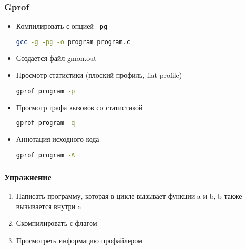 \begin{frame}[fragile]
 \frametitle{Gprof}
 \begin{itemize}
   \item Компилировать с опцией \texttt{-pg}
\begin{lstlisting}[language=sh]
 gcc -g -pg -o program program.c
\end{lstlisting}
   \item Создается файл gmon.out
   \item Просмотр статистики (плоский профиль, flat profile) 
\begin{lstlisting}[language=sh]
gprof program -p
\end{lstlisting}
    \item Просмотр графа вызовов со статистикой
\begin{lstlisting}[language=sh]
gprof program -q
\end{lstlisting}
    \item Аннотация исходного кода
\begin{lstlisting}[language=sh]
gprof program -A
\end{lstlisting}
 \end{itemize}
\end{frame}

\begin{frame}
  \frametitle{Упражнение}
  \begin{enumerate}
    \item Написать программу, которая в цикле вызывает функции a и b, b также вызывается внутри a
    \item Скомпилировать с флагом 
    \item Просмотреть информацию профайлером
  \end{enumerate}
\end{frame}

